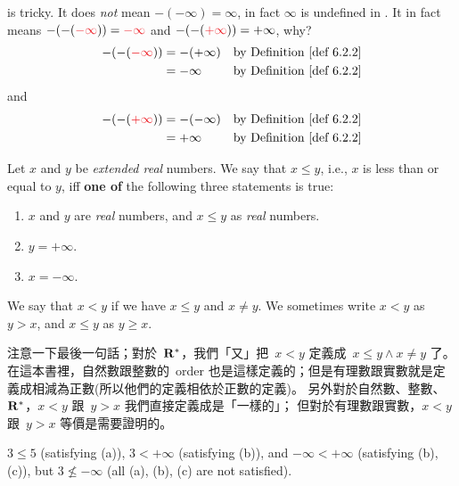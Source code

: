 \begin{note}
\MAROON{(*)} is tricky.
It does \emph{not} mean \(-(-\infty) = \infty\), in fact \(\infty\) is undefined in .
It in fact means \(-(-(\RED{-\infty})) = \RED{-\infty}\) and \(-(-(\RED{+\infty})) = +\infty\), why?
\begin{align*}
    -(-(\RED{-\infty})) & = -(+\infty) & \text{by \DEF{6.2.2}} \\
                        & = -\infty & \text{by \DEF{6.2.2}}
\end{align*}
and
\begin{align*}
    -(-(\RED{+\infty})) & = -(-\infty) & \text{by \DEF{6.2.2}} \\
                        & = +\infty & \text{by \DEF{6.2.2}}
\end{align*}
\end{note}

\begin{definition}  \label{def 6.2.3}
Let \(x\) and \(y\) be \emph{extended real} numbers.
We say that \(x \le y\), i.e., \(x\) is less than or equal to \(y\), iff \textbf{one of} the following three statements is true:
\begin{enumerate}
    \item \(x\) and \(y\) are \emph{real} numbers, and \(x \le y\) as \emph{real} numbers.
    \item \(y = +\infty\).
    \item \(x = -\infty\).
\end{enumerate}
We say that \(x < y\) if we have \(x \le y\) and \(x \ne y\).
We sometimes write \(x < y\) as \(y > x\), and \(x \le y\) as \(y \ge x\).
\end{definition}

\begin{note}
注意一下最後一句話；對於\ \(\mathbf{R}^*\)，我們「又」把\ \(x < y\) 定義成\ \(x \le y \land x \ne y\) 了。
在這本書裡，自然數跟整數的\ order 也是這樣定義的；但是有理數跟實數就是定義成相減為正數(所以他們的定義相依於正數的定義)。
另外對於自然數、整數、\(\mathbf{R}^*\)，\(x < y\) 跟\ \(y > x\) 我們直接定義成是「一樣的」；
但對於有理數跟實數，\(x < y\) 跟\ \(y > x\) 等價是需要證明的。
\end{note}

\begin{example} \label{example 6.2.4}
\(3 \le 5\) (satisfying (a)), \(3 < +\infty\) (satisfying (b)), and \(-\infty < +\infty\) (satisfying (b), (c)), but \(3 \not \le -\infty\) (all (a), (b), (c) are not satisfied).
\end{example}

